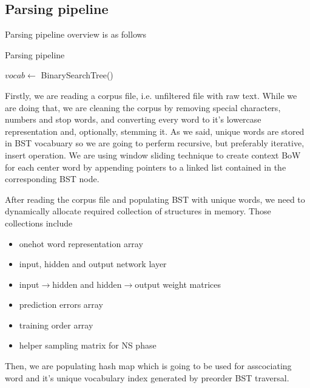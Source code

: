 \documentclass{article}
\newcommand{\SetAlgoStyle}{
	\SetAlgoNoLine
	\SetAlgoNoEnd
	\DontPrintSemicolon
}
\begin{document}
\subsection{Parsing pipeline}

Parsing pipeline overview is as follows

\begin{algorithm}[H]
	\caption{Parsing pipeline}
	\SetAlgoStyle
	$vocab \gets$ BinarySearchTree()\;
\end{algorithm}

Firstly, we are reading a corpus file, i.e. unfiltered file with raw
text. While we are doing that, we are cleaning the corpus by removing special
characters, numbers and stop words, and converting every word to it's
lowercase representation and, optionally, stemming it. As we said, unique words are stored in BST
vocabuary so we are going to perferm recursive, but preferably iterative,
insert operation. We are using window sliding technique to create context BoW 
for each center word by appending pointers to a linked list contained in the
corresponding BST node.

\medbreak

After reading the corpus file and populating BST with unique words, we need to
dynamically allocate required collection of structures in memory. Those
collections include

\begin{itemize}
	\item onehot word representation array
	\item input, hidden and output network layer
	\item input$\rightarrow$hidden and hidden$\rightarrow$output weight matrices
	\item prediction errors array
	\item training order array
	\item helper sampling matrix for NS phase
\end{itemize}

\medbreak

Then, we are populating hash map which is going to be used for asscociating
word and it's unique vocabulary index generated by preorder BST traversal.
\end{document}
